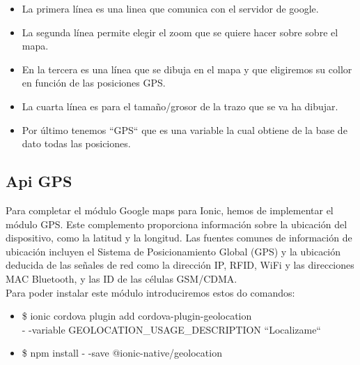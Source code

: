 \documentclass[a4paper, 11pt]{article}
\begin{document}
\begin{itemize}
              \begin{itemize}
                  \item{La primera línea es una linea que comunica con el
                        servidor de google.}
                  \item{La segunda línea permite elegir el zoom que se quiere
                        hacer sobre sobre el mapa.}
                  \item{En la tercera es una línea que se dibuja en el mapa y
                        que eligiremos su collor en función de las posiciones
                        GPS.}
                  \item{La cuarta línea es para el tamaño/grosor de la trazo
                        que se va ha dibujar.}
                  \item{Por último tenemos ``{{GPS}}`` que es una variable
                        la cual obtiene de la base de dato todas las posiciones.}
              \end{itemize}

            \subsection{Api GPS}

              Para completar el módulo Google maps para Ionic, hemos de implementar
              el módulo GPS. Este complemento proporciona información sobre la ubicación del
              dispositivo, como la latitud y la longitud. Las fuentes comunes
              de información de ubicación incluyen el Sistema de Posicionamiento
              Global (GPS) y la ubicación deducida de las señales de red como
              la dirección IP, RFID, WiFi y las direcciones MAC Bluetooth, y
              las ID de las células GSM/CDMA.\\

              Para poder instalar este módulo introduciremos estos do comandos:\\
                \begin{itemize}
                    \item{\$ ionic cordova plugin add cordova-plugin-geolocation \\
                            - -variable GEOLOCATION\_USAGE\_DESCRIPTION ``Localizame`` }
                    \item{\$ npm install - -save @ionic-native/geolocation}
                \end{itemize}


\end{itemize}
\end{document}
